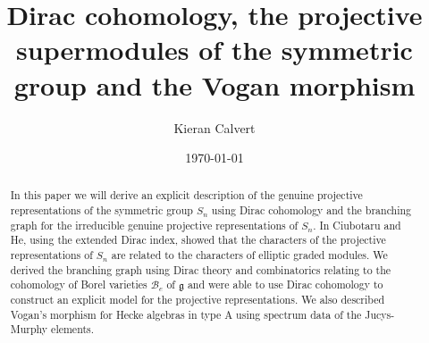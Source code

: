 \documentclass[a4paper,10pt]{amsart}
\title[Realising the projective representation of $S_n$]{Dirac cohomology, the projective supermodules of the symmetric group and the Vogan morphism}
\date{\today}
\author{Kieran Calvert}
\begin{document}
\maketitle
\begin{abstract}In this paper we will derive an explicit description of the genuine projective representations of the symmetric group $S_n$ using Dirac cohomology and the branching graph for the irreducible genuine projective representations of $S_n$. In \cite{CH15} Ciubotaru and He, using the extended Dirac index, showed that the characters of the projective representations of $S_n$ are related to the characters of elliptic graded modules. 
We derived the branching graph using Dirac theory and combinatorics relating to the cohomology of Borel varieties $\mathcal{B}_e$ of $\mathfrak{g}$ and were able to use Dirac cohomology to construct an explicit model for the projective representations. We also described Vogan's morphism for Hecke algebras in type A using spectrum data of the Jucys-Murphy elements. \end{abstract} %
\end{document}
